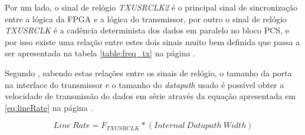 Por um lado, o sinal de relógio \textit{TXUSRCLK2} é o principal sinal de sincronização entre a lógica da FPGA e a lógica do transmissor, por outro o sinal de relógio \textit{TXUSRCLK} é a cadência determinista dos dados em paralelo no bloco PCS, e por isso existe uma relação entre estes dois sinais muito bem definida que passa a ser apresentada na tabela \ref{table:freq_tx} na página \pageref{table:freq_tx}.

\begin{table}[h!]
	\centering
	\caption{Relação entre as frequências dos sinais de relógio \textit{TXUSRCLK2} e \textit{TXUSRCLK}, adaptada de \cite{R011}}
	\label{table:freq_tx}
\end{table}


Segundo \cite{R011}, sabendo estas relações entre os sinais de relógio, o tamanho da porta na interface do transmissor e o tamanho do \textit{datapath} usado é possível obter a velocidade de transmissão do dados em série através da equação apresentada em \ref{eq:lineRate} na página \pageref{eq:lineRate}.

\begin{equation} \label{eq:lineRate}
Line\ Rate = F_{TXUSRCLK}*(Internal\ Datapath\ Width)
\end{equation}



